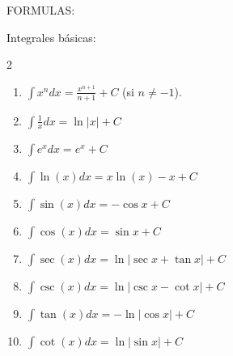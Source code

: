 \documentclass{article}
\begin{document}
\newpage
\noindent\textsf{\large FORMULAS:}
\vspace{3mm}

{\large Integrales básicas:}
\begin{multicols}{2}
  \begin{enumerate}
    \item $\displaystyle\int x^n dx = \frac{x^{n+1}}{n+1}+C$ (si $n\neq -1$).
    \item $\displaystyle\int \frac{1}{x}dx = \ln|x|+C$
    \item $\displaystyle\int e^x dx = e^x+C$
    \item $\displaystyle\int \ln(x) dx = x\ln(x)-x+C$
    \item $\displaystyle\int \sin(x) dx = -\cos x+C$
    \item $\displaystyle\int \cos(x) dx = \sin x+C$
    \item $\displaystyle\int \sec(x) dx = \ln|\sec x+\tan x|+C$
    \item $\displaystyle\int \csc(x) dx = \ln|\csc x-\cot x|+C$
    \item $\displaystyle\int \tan(x) dx = -\ln|\cos x|+C$
    \item $\displaystyle\int \cot(x) dx = \ln|\sin x|+C$
  \end{enumerate}
\end{multicols}
\vspace{2mm}
\end{document}
